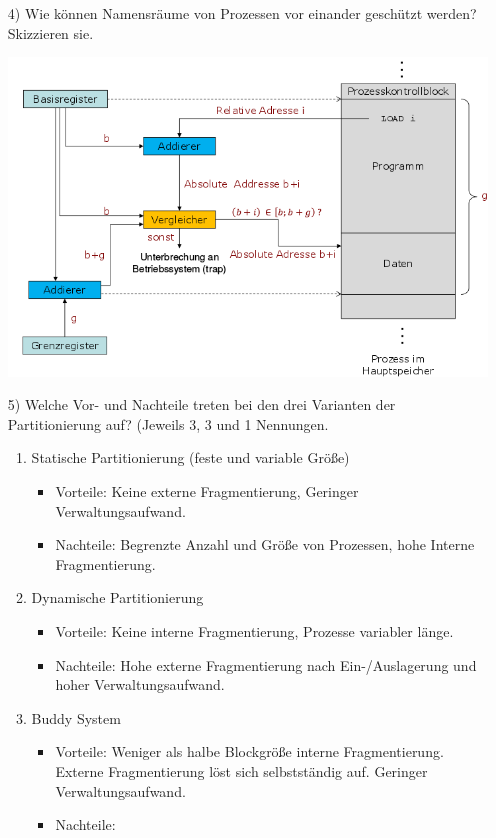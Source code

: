 \documentclass[11pt,a4paper]{article}
\begin{document}
\begin{itemize}
\item[4)] Wie können Namensräume von Prozessen vor einander geschützt werden? Skizzieren sie.

\includegraphics[scale=0.6]{schutz.png}

\item[5)] Welche Vor- und Nachteile treten bei den drei Varianten der Partitionierung auf? (Jeweils 3, 3 und 1 Nennungen.

\begin{enumerate}
\item Statische Partitionierung (feste und variable Größe)
\begin{itemize}
\item Vorteile: Keine externe Fragmentierung, Geringer Verwaltungsaufwand.
\item Nachteile: Begrenzte Anzahl und Größe von Prozessen, hohe Interne Fragmentierung.
\end{itemize}

\item Dynamische Partitionierung
\begin{itemize}
\item Vorteile: Keine interne Fragmentierung, Prozesse variabler länge.
\item Nachteile: Hohe externe Fragmentierung nach Ein-/Auslagerung und hoher Verwaltungsaufwand.
\end{itemize}

\item Buddy System
\begin{itemize}
\item Vorteile: Weniger als halbe Blockgröße interne Fragmentierung. Externe Fragmentierung löst sich selbstständig auf. Geringer Verwaltungsaufwand.
\item Nachteile: 
\end{itemize}


\end{enumerate}
\end{itemize}
\end{document}

